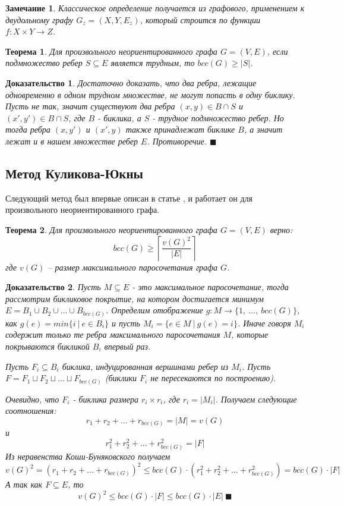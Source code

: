 \documentclass[a4paper]{article}
\newtheorem*{mremark}{Замечание}
\newtheorem{mtheorem}{Теорема}[section]
\newtheorem*{msolution}{Доказательство}
\begin{document}
\begin{mremark}
	Классическое определение получается из графового, применением к двудольному графу $G_z = (X, Y, E_z)$, 
	который строится по функции $f: X\times Y \rightarrow Z$.
\end{mremark}

	
\begin{mtheorem}
    Для произвольного неориентированного графа $G = (V, E)$, если подмножество ребер $S \subseteq E$ 
    является трудным, то $bcc(G) \geq |S|$.
\end{mtheorem}

\begin{msolution}
    Достаточно доказать, что два ребра, лежащие одновременно в одном трудном множестве, не могут 
    попасть в одну биклику. Пусть не так, значит существуют два ребра $(x, y)\in B\cap S$ и 
    $(x', y')\in B\cap S$, где $B$ - биклика, а $S$ - трудное подмножество ребер. Но тогда ребра 
    $(x, y')$ и $(x', y)$ также принадлежат биклике $B$, а значит лежат и в нашем множестве ребер 
    $E$. Противоречие. $\blacksquare$
\end{msolution}

\subsection{Метод Куликова-Юкны}
Следующий метод был впервые описан в статье \cite{KulikovJukna}, и работает он для произвольного 
неориентированного графа.

\begin{mtheorem}
    Для произвольного неориентированного графа $G = (V, E)$ верно: $$bcc(G)\geq \left\lceil\frac{v(G)^2}{|E|}\right\rceil$$ 
    где $v(G)$ -- размер максимального паросочетания графа $G$.
\end{mtheorem}

\begin{msolution}
	Пусть $M\subseteq E$ - это максимальное паросочетание, тогда рассмотрим бикликовое покрытие, 
	на котором достигается минимум $E = B_1\cup B_2\cup \ldots \cup B_{bcc(G)}$. Определим 
	отображение $g:M\rightarrow \{1,\ \ldots,\ bcc(G)\}$, как $g(e) = min\{i\ |\ e\in B_i\}$ и пусть 
	$M_i = \{e\in M\ |\ g(e) = i\}$. Иначе говоря $M_i$ содержит только те ребра максимального 
	паросочетания $M$, которые покрываются бикликой $B_i$ впервый раз.
	
	Пусть $F_i \subseteq B_i$ биклика, индуцированная вершинами ребер из $M_i$. Пусть 
	$F = F_1\sqcup F_2\sqcup \ldots \sqcup F_{bcc(G)}$ (биклики $F_i$ не пересекаются по построению).
	
	Очевидно, что $F_i$ - биклика размера $r_i\times r_i$, где $r_i = |M_i|$. Получаем следующие 
	соотношения: $$r_1 + r_2 + \ldots + r_{bcc(G)} = |M| = v(G)$$ и 
	$$r_1^2 + r_2^2 + \ldots + r_{bcc(G)}^2 = |F|$$ Из неравенства Коши-Буняковского получаем 
	$$v(G)^2 = (r_1 + r_2 + \ldots + r_{bcc(G)})^2 \leq bcc(G)\cdot (r_1^2 + r_2^2 + \ldots + r_{bcc(G)}^2) = bcc(G)\cdot |F|$$
	А так как $F \subseteq E$, то $$v(G)^2\leq bcc(G)\cdot |F| \leq bcc(G)\cdot |E|\ \blacksquare$$

\end{msolution}
\end{document}
